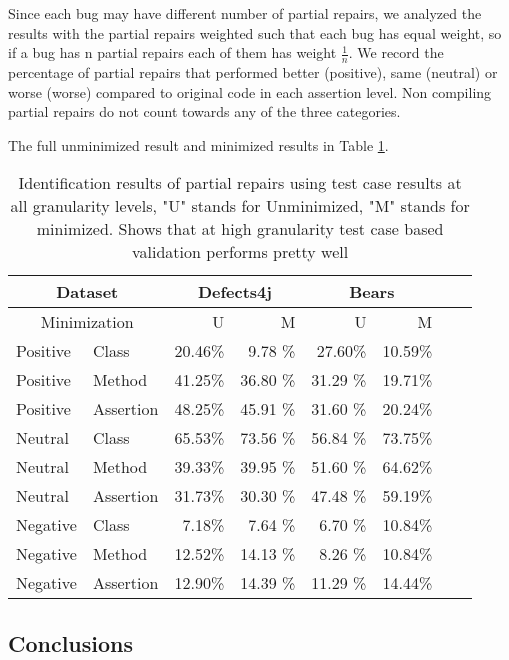 \documentclass[sigconf, timestamp-false, anonymous=true]{acmart}
\begin{document}
Since each bug may have different 
number of partial repairs, we analyzed the results with the partial repairs weighted such that each bug
has equal weight, so if a bug has n partial repairs each of them has weight 
$\frac{1}{n}$. We record the percentage of partial repairs that performed better (positive), same (neutral)
or worse (worse) compared to original code in each assertion level. Non compiling
partial repairs do not count towards any of the three categories.

The full unminimized result and minimized results in Table \ref{yiweitable}.


\begin{table}
{\begin{center}
\begin{tabular}{| l | l | r | r | r | r | r | r |}
\hline
\multicolumn{2}{|c|}{Dataset} &\multicolumn{2}{|c|}{Defects4j} & \multicolumn{2}{|c|}{Bears} \\
\hline
\multicolumn{2}{|c|}{Minimization} & U & M & U & M  \\
\hline
Positive & Class & 20.46\% & 9.78 \% & 27.60\% & 10.59\%  \\
Positive & Method & 41.25\% & 36.80 \% & 31.29 \% & 19.71\%  \\
Positive & Assertion & 48.25\% & 45.91 \% & 31.60 \% & 20.24\%  \\ 
\hline
Neutral & Class & 65.53\% & 73.56 \% & 56.84 \% & 73.75\% \\
Neutral & Method & 39.33\% & 39.95 \% & 51.60 \% & 64.62\%  \\
Neutral & Assertion & 31.73\% & 30.30 \% & 47.48 \% &  59.19\%  \\ 
\hline
Negative & Class & 7.18\% & 7.64 \% & 6.70 \% & 10.84\%  \\
Negative & Method & 12.52\% & 14.13 \% & 8.26 \% & 10.84\%  \\
Negative & Assertion & 12.90\% & 14.39 \% & 11.29 \% &  14.44\%  \\ 
\hline
\end{tabular}
\end{center}}
\caption{Identification results of partial repairs using test case results
at all granularity levels, "U" stands for Unminimized, "M" stands for minimized.
Shows that at high granularity test case based validation performs pretty well}
\label{yiweitable}
\end{table}

    
\subsection{Conclusions}
\end{document}
